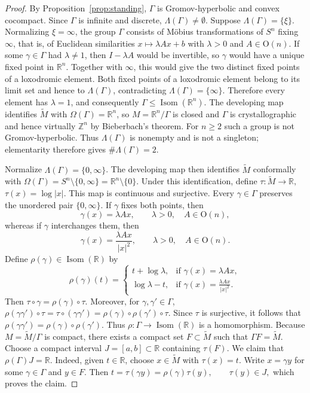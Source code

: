 \documentclass[12pt,oneside,a4paper]{article}
\theoremstyle{mytheorem}
\theoremstyle{remark}
\theoremstyle{definition}
\begin{document}
\begin{proof}
By Proposition~\ref{prop:standing}, $\Gamma$ is Gromov-hyperbolic and convex
cocompact.
Since \(\Gamma\) is infinite and discrete, \(\Lambda(\Gamma)\neq\emptyset\).
Suppose \(\Lambda(\Gamma)=\{\xi\}\). Normalizing \(\xi=\infty\), the
group \(\Gamma\) consists of M\"obius transformations of \(S^n\) fixing
\(\infty\), that is, of Euclidean similarities \(x\mapsto\lambda Ax+b\)
with \(\lambda>0\) and \(A\in\mathrm O(n)\).  If some \(\gamma\in\Gamma\) had \(\lambda\neq1\), then \(I-\lambda A\) would be invertible, so \(\gamma\) would have a unique fixed point in \(\mathbb R^n\). Together with \(\infty\), this would give
the two distinct fixed points of a loxodromic element. Both fixed points
of a loxodromic element belong to its limit set and hence to
\(\Lambda(\Gamma)\), contradicting
\(\Lambda(\Gamma)=\{\infty\}\). Therefore every element has
\(\lambda=1\), and consequently $\Gamma\leq\operatorname{Isom}(\mathbb R^n).$
   The developing map identifies \(\widetilde M\)
with \(\Omega(\Gamma)=\mathbb R^n\), so \(M=\mathbb R^n/\Gamma\) is
closed and $\Gamma$ is crystallographic and hence virtually $\mathbb{Z}^n$ by Bieberbach's theorem. For \(n\geq2\) such a group is not Gromov-hyperbolic. Thus \(\Lambda(\Gamma)\) is nonempty and is not a singleton; elementarity therefore gives \(\#\Lambda(\Gamma)=2\).

Normalize \(\Lambda(\Gamma)=\{0,\infty\}\). The developing map then
identifies \(\widetilde M\) conformally with
$\Omega(\Gamma) =S^n\setminus\{0,\infty\} =\mathbb R^n\setminus\{0\}.$
Under this identification, define
$\tau\colon\widetilde M \to \mathbb R,$
$\tau(x)=\log |x|.$
This map is continuous and surjective. Every \(\gamma\in\Gamma\) preserves the unordered pair
\(\{0,\infty\}\).  If \(\gamma\) fixes both points, then
\[
 \gamma(x)=\lambda Ax,
 \qquad \lambda>0,\quad A\in\mathrm O(n),
\]
whereas if \(\gamma\) interchanges them, then
\[
 \gamma(x)=\frac{\lambda Ax}{|x|^2},
 \qquad \lambda>0,\quad A\in\mathrm O(n).
\]
Define \(\rho(\gamma)\in\operatorname{Isom}(\mathbb R)\) by
\[
 \rho(\gamma)(t)=
 \begin{cases}
  t+\log\lambda,
   &\text{if }\gamma(x)=\lambda Ax,\\[2mm]
  \log\lambda-t,
   &\text{if }\displaystyle
     \gamma(x)=\frac{\lambda Ax}{|x|^2}.
 \end{cases}
\]
Then $\tau\circ\gamma=\rho(\gamma)\circ\tau$. Moreover, for
\(\gamma,\gamma'\in\Gamma\),
$\rho(\gamma\gamma')\circ\tau
 =\tau\circ(\gamma\gamma')
=\rho(\gamma)\circ\rho(\gamma')\circ\tau.$
Since \(\tau\) is surjective, it follows that
$\rho(\gamma\gamma')=\rho(\gamma)\circ\rho(\gamma').$ Thus $\rho\colon\Gamma\to \operatorname{Isom}(\mathbb R)
$ is a homomorphism. Because \(M=\widetilde M/\Gamma\) is compact, there exists a compact
set \(F\subset\widetilde M\) such that
$\Gamma F=\widetilde M.$ Choose a compact interval \(J=[a,b]\subset\mathbb R\) containing
\(\tau(F)\).  We claim that $ \rho(\Gamma)J=\mathbb R.$
Indeed, given \(t\in\mathbb R\), choose \(x\in\widetilde M\) with
\(\tau(x)=t\).  Write \(x=\gamma y\) for some
\(\gamma\in\Gamma\) and \(y\in F\).  Then
$t=\tau(\gamma y)=\rho(\gamma)\tau(y),
 \qquad \tau(y)\in J,$ which proves
the claim.


\end{proof}
\end{document}
